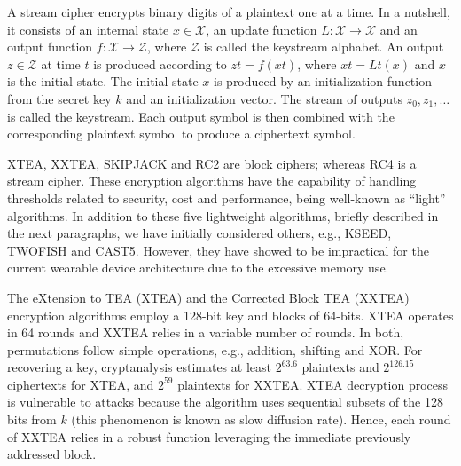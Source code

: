 A stream cipher encrypts binary digits of a plaintext one at a time. %
In a nutshell, it consists of an internal state $x \in \mathcal{X}$, an update
function $L: \mathcal{X} \rightarrow \mathcal{X}$ and an output function $f: \mathcal{X} \rightarrow \mathcal{Z}$, where $\mathcal{Z}$ is called the keystream
alphabet. An output $z \in \mathcal{Z}$ at time $t$ is produced according to $zt = f(xt)$, where $xt = Lt(x)$
and $x$ is the initial state. The initial state $x$ is produced by an initialization function
from the secret key $k$ and an initialization vector. The stream of outputs $z_0, z_1, \ldots$ is called the keystream. Each output symbol is then combined with the
corresponding plaintext symbol to produce a ciphertext symbol.

XTEA, XXTEA, SKIPJACK and RC2 are block ciphers; whereas RC4 is a stream cipher. %
These encryption algorithms have the %
capability of %
handling thresholds related to security, cost and performance, being well-known as ``light'' algorithms. In addition to these five lightweight algorithms, briefly described in the next paragraphs, we have initially considered others, e.g., KSEED, TWOFISH and CAST5. However, they have showed to be impractical for the current wearable device architecture due to the excessive memory use. %

The eXtension to TEA (XTEA) and the Corrected Block TEA (XXTEA) encryption algorithms %
employ a 128-bit key and blocks of 64-bits. XTEA operates in 64 rounds and XXTEA relies in a variable number of rounds. In both, permutations follow simple operations, e.g., addition, shifting and XOR. For recovering a key, cryptanalysis estimates at least $2^{63.6}$ plaintexts and $2^{126.15}$ ciphertexts for XTEA, and $2^{59}$ plaintexts for XXTEA. %
XTEA decryption process is vulnerable to attacks because the algorithm uses sequential subsets of the 128 bits from $k$ (this phenomenon is known as slow diffusion rate). Hence, each round of XXTEA relies in a robust function leveraging the immediate previously addressed block. %


